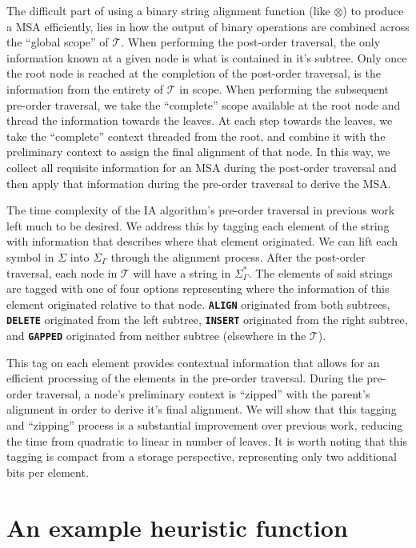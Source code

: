 \documentclass{bmcart}
\begin{document}
The difficult part of using a binary string alignment function (like $\otimes$) to produce a MSA efficiently, lies in how the output of binary operations are combined across the ``global scope'' of $\mathcal{T}$.
When performing the post-order traversal, the only information known at a given node is what is contained in it's subtree.
Only once the root node is reached at the completion of the post-order traversal, is the information from the entirety of $\mathcal{T}$ in scope.
When performing the subsequent pre-order traversal, we take the ``complete'' scope available at the root node and thread the information towards the leaves.
At each step towards the leaves, we take the ``complete'' context threaded from the root, and combine it with the preliminary context to assign the final alignment of that node.
In this way, we collect all requisite information for an MSA during the post-order traversal and then apply that information during the pre-order traversal to derive the MSA.

The time complexity of the IA algorithm's pre-order traversal in previous work left much to be desired.
We address this by tagging each element of the string with information that describes where that element originated.
We can lift each symbol in $\Sigma$ into $\Sigma_{\Gamma}$ through the alignment process.
After the post-order traversal, each node in $\mathcal{T}$ will have a string in $\Sigma_{\Gamma}^{*}$.
The elements of said strings are tagged with one of four options representing where the information of this element originated relative to that node.
\textbf{\texttt{ALIGN}} originated from both subtrees, \textbf{\texttt{DELETE}} originated from the left subtree, \textbf{\texttt{INSERT}} originated from the right subtree, and \textbf{\texttt{GAPPED}} originated from neither subtree (elsewhere in the $\mathcal{T}$).

This tag on each element provides contextual information that allows for an efficient processing of the elements in the pre-order traversal.
During the pre-order traversal, a node's preliminary context is ``zipped'' with the parent's alignment in order to derive it's final alignment.
We will show that this tagging and ``zipping'' process is a substantial improvement over previous work, reducing the time from quadratic to linear in number of leaves.
It is worth noting that this tagging is compact from a storage perspective, representing only two additional bits per element.


\section*{An example heuristic function}
\end{document}
